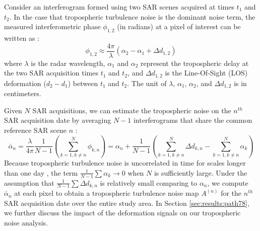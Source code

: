 Consider an interferogram formed using two SAR scenes acquired at times $t_1$ and $t_2$. In the case that tropospheric turbulence noise is the dominant noise term, the measured interferometric phase $\phi_{1,2}$ (in radians) at a pixel of interest can be written as \cite{Zebker1997AtmosphericEffectsInterferometric}:
\begin{equation}
	\phi_{1,2} \approx \frac{4 \pi}{\lambda} \left(\alpha_2 - \alpha_1 + \Delta d_{1,2} \right)
\end{equation}
where $ \lambda $ is the radar wavelength, $\alpha_1$ and $\alpha_2$ represent the tropospheric delay at the two SAR acquisition times $t_1$ and $t_2$, and $\Delta d_{1,2} $ is the Line-Of-Sight (LOS) deformation ($d_2-d_1$) between $t_1$ and $t_2$. The unit of $\lambda$, $\alpha_1$, $\alpha_2$, and $\Delta d_{1,2} $ is in centimeters. 

Given $N$ SAR acquisitions, we can estimate the tropospheric noise on the $n^{th}$ SAR acquisition date by averaging $N-1$ interferograms that share the common reference SAR scene $n$ \cite{Tymofyeyeva2015MitigationAtmosphericPhase}:
\begin{equation}
	\bar{\alpha}_n = \frac{\lambda}{4 \pi} \frac{1}{N-1} \left(\sum_{k=1, k \neq n}^{N} \phi_{k,n}\right)  
	=  \alpha_n  + \frac{1}{N-1} \left( \sum_{k=1, k \neq n}^{N}  \Delta d_{k,n} - \sum_{k=1, k \neq n}^{N}  \alpha_k  \right)  \label{eq:avg-ifg} 
\end{equation}
Because tropospheric turbulence noise is uncorrelated in time for scales longer than one day \cite{Emardson2003NeutralAtmosphericDelay, Onn2006ModelingWaterVapor}, the term $ \frac{1}{N-1} \sum \alpha_k \rightarrow 0$ when $N$ is sufficiently large. 
Under the assumption that $ \frac{1}{N-1} \sum \Delta d_{k,n} $ is relatively small comparing to $\alpha_n$, we compute $ \bar{\alpha}_n $ at each pixel to obtain a tropospheric turbulence noise map $A^{(n)}$ for the $n^{th}$ SAR acquisition date over the entire study area. In Section \ref{sec:results:path78}, we further discuss the impact of the deformation signals on our tropospheric noise analysis.


